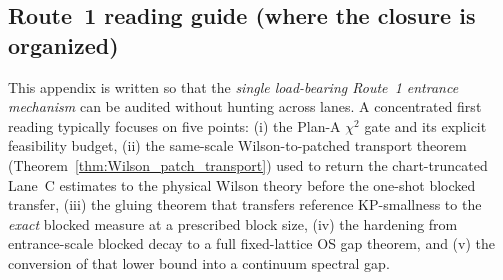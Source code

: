 \subsection*{Route~1 reading guide (where the closure is organized)}
This appendix is written so that the \emph{single load-bearing Route~1 entrance mechanism} can be audited without hunting across lanes.
A concentrated first reading typically focuses on five points: (i) the Plan-A $\chi^2$ gate and its explicit feasibility budget,
(ii) the same-scale Wilson-to-patched transport theorem (Theorem~\ref{thm:Wilson_patch_transport}) used to return the chart-truncated Lane~C estimates to the physical Wilson theory before the one-shot blocked transfer,
(iii) the gluing theorem that transfers reference KP-smallness to the \emph{exact} blocked measure at a prescribed block size,
(iv) the hardening from entrance-scale blocked decay to a full fixed-lattice OS gap theorem, and
(v) the conversion of that lower bound into a continuum spectral gap.
